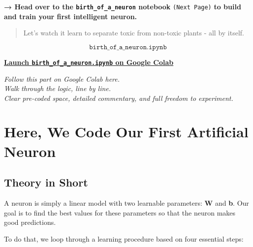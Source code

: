 \documentclass[11pt]{article}
\begin{document}
\begin{center}
\textbf{\Large → Head over to the \texttt{birth\_of\_a\_neuron} notebook}  
\texttt{(Next Page)}  
\textbf{to build and train your first intelligent neuron.}
\end{center}

\vspace{1em}

\begin{quote}
Let's watch it learn to separate toxic from non-toxic plants - all by itself.
\end{quote}

\newpage
{}
\label{sec:practice_00}

\[
\texttt{birth\_of\_a\_neuron.ipynb}
\]

\begin{tcolorbox}[enhanced, sharp corners=south, colback=white, colframe=black!80,
  boxrule=0.8pt, drop shadow southeast,
  width=\textwidth, before skip=10pt, after skip=10pt, halign=center,
  fontupper=\sffamily\large]

\href{https://colab.research.google.com/github/Pchambet/Deep-Learning-from-Scratch/blob/main/notebooks/birth_of_a_neuron.ipynb}{
  \quad \textbf{\large Launch \texttt{birth\_of\_a\_neuron.ipynb} on Google Colab}
}

\vspace{0.5em}

{\color{gray!80!black}\small%
\textit{Follow this part on Google Colab here.}\\
\textit{Walk through the logic, line by line.}\\
\textit{Clear pre-coded space, detailed commentary, and full freedom to experiment.}
}
\end{tcolorbox}

\section*{Here, We Code Our First Artificial Neuron}

\subsection*{Theory in Short}

A neuron is simply a linear model with two learnable parameters: \textbf{W} and \textbf{b}.  
Our goal is to find the best values for these parameters so that the neuron makes good predictions.

To do that, we loop through a learning procedure based on four essential steps:
\end{document}
